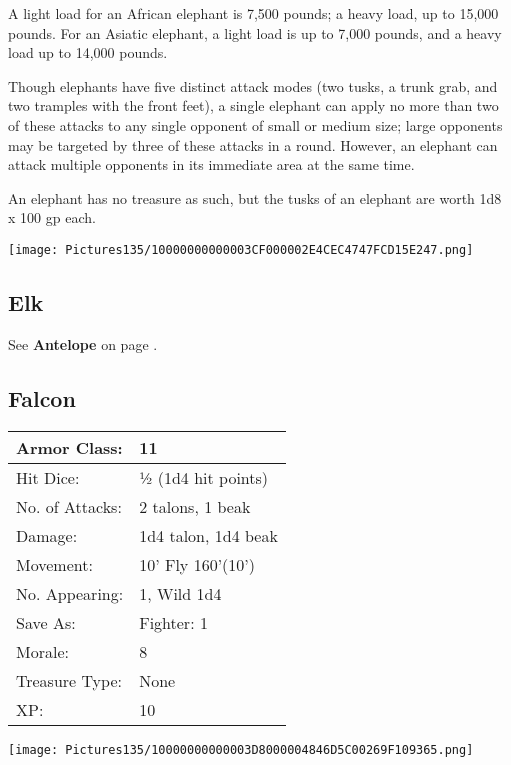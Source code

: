 \documentclass[a4paper,twoside,openany,10pt]{book}
\begin{document}
\begin{multicols}{2}
A light load for an African elephant is 7,500 pounds; a heavy load, up to 15,000 pounds. For an Asiatic elephant, a light load is up to 7,000 pounds, and a heavy load up to 14,000 pounds.

Though elephants have five distinct attack modes (two tusks, a trunk grab, and two tramples with the front feet), a single elephant can apply no more than two of these attacks to any single opponent of small or medium size; large opponents may be targeted by three of these attacks in a round. However, an elephant can attack multiple opponents in its immediate area at the same time.

An elephant has no treasure as such, but the tusks of an elephant are worth 1d8 x 100 gp each.\medskip

\begin{center}
	\texttt{[image: Pictures135/10000000000003CF000002E4CEC4747FCD15E247.png]}
\end{center}

\subsection*{Elk}\label{elk}

See \textbf{Antelope} on page \hyperlink{antelope}{\pageref{antelope}}.

\subsection*{Falcon}\label{falcon}

\begin{tabularx}{0.48\textwidth}{@{}lX@{}}
Armor Class: & 11 \\\hline
Hit Dice: & ½ (1d4 hit points) \\\hline
No. of Attacks: & 2 talons, 1 beak \\\hline
Damage: & 1d4 talon, 1d4 beak \\\hline
Movement: & 10' Fly 160'(10') \\\hline
No. Appearing: & 1, Wild 1d4 \\\hline
Save As: & Fighter: 1 \\\hline
Morale: & 8 \\\hline
Treasure Type: & None \\\hline
XP: & 10 \\\hline
\end{tabularx}\medskip


\begin{center}
	\texttt{[image: Pictures135/10000000000003D8000004846D5C00269F109365.png]}
\end{center}


\end{multicols}
\end{document}
